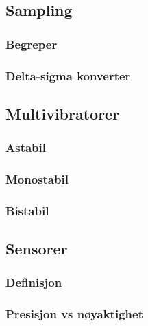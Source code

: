 \subsection{Sampling}
  \subsubsection{Begreper}
    
  \subsubsection{Delta-sigma konverter}
    
\subsection{Multivibratorer}
  
  \subsubsection{Astabil}
    
  \subsubsection{Monostabil}
    
  \subsubsection{Bistabil}
    
\subsection{Sensorer}
  \subsubsection{Definisjon}
    
  \subsubsection{Presisjon vs nøyaktighet}
    
